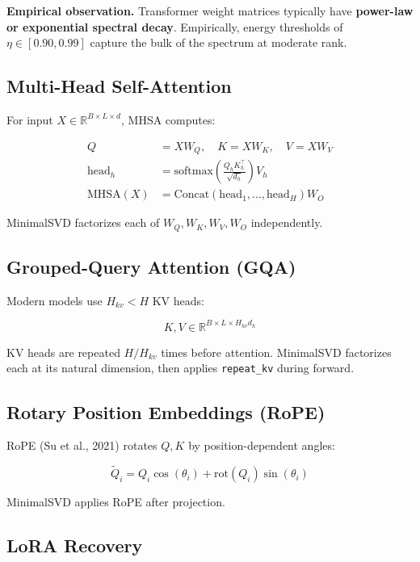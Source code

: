 \textbf{Empirical observation.} Transformer weight matrices typically have 
\textbf{power-law or exponential spectral decay}. Empirically, energy thresholds 
of $\eta \in [0.90, 0.99]$ capture the bulk of the spectrum at moderate rank.

\subsection{Multi-Head Self-Attention}

For input $X \in \mathbb{R}^{B \times L \times d}$, MHSA computes:

\[
\begin{aligned}
Q &= X W_Q, \quad K = X W_K, \quad V = X W_V \\
\text{head}_h &= \text{softmax}\!\left(\frac{Q_h K_h^\top}{\sqrt{d_h}}\right) V_h \\
\text{MHSA}(X) &= \text{Concat}(\text{head}_1, \dots, \text{head}_H) W_O
\end{aligned}
\tag{3.7}
\]

MinimalSVD factorizes each of $W_Q, W_K, W_V, W_O$ independently.

\subsection{Grouped-Query Attention (GQA)}

Modern models use $H_{kv} < H$ KV heads:

\[
K, V \in \mathbb{R}^{B \times L \times H_{kv} d_h}
\tag{3.8}
\]

KV heads are repeated $H / H_{kv}$ times before attention. MinimalSVD 
factorizes each at its natural dimension, then applies \texttt{repeat\_kv} during 
forward.

\subsection{Rotary Position Embeddings (RoPE)}

RoPE (Su et al., 2021) rotates $Q, K$ by position-dependent angles:

\[
\tilde{Q}_i = Q_i \cos(\theta_i) + \text{rot}(Q_i) \sin(\theta_i)
\tag{3.9}
\]

MinimalSVD applies RoPE after projection.

\subsection{LoRA Recovery}

